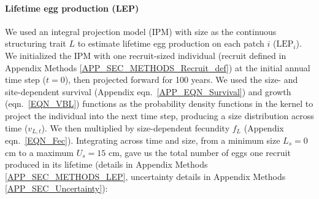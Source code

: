 \documentclass[12pt, oneside]{article}   	%
\begin{document}
\paragraph*{Lifetime egg production (LEP)}

We used an integral projection model (IPM) \citep{ellner2016data} with size as the continuous structuring trait $L$ to estimate lifetime egg production on each patch $i$ ($\text{LEP}_i$). We initialized the IPM with one recruit-sized individual (recruit defined in Appendix Methods \ref{APP_SEC_METHODS_Recruit_def}) at the initial annual time step ($t=0$), then projected forward for 100 years. We used the size- and site-dependent survival (Appendix eqn.\ \ref{APP_EQN_Survival}) and growth (eqn.\ \ref{EQN_VBL}) functions as the probability density functions in the kernel to project the individual into the next time step, producing a size distribution across time ($v_{L,t}$). We then multiplied by size-dependent fecundity $f_L$ (Appendix eqn.\ \ref{EQN_Fec}). Integrating across time and size, from a minimum size $L_s=0$ cm to a maximum $U_s=15$ cm, gave us the total number of eggs one recruit produced in its lifetime (details in Appendix Methods \ref{APP_SEC_METHODS_LEP}, uncertainty details in Appendix Methods \ref{APP_SEC_Uncertainty}):



\end{document}
